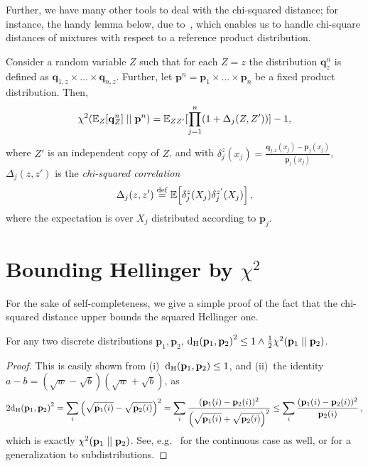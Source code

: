 \documentclass[10pt]{article}
\newcommand{\p}{\mathbf{p}}
\newcommand{\q}{\mathbf{q}}
\newcommand{\ns}{n}
\begin{document}
Further, we have many other tools to deal with the chi-squared distance; for instance, the handy lemma below, due to~\cite{Pollard03}, which enables us to handle chi-square distances of mixtures with respect to a reference product distribution.
\begin{lemma}\label{lem:mixture_chisquare}
Consider a random variable $Z$ such that for each
$Z=z$ the distribution $\q_z^\ns$ is defined as
$\q_{1,z} \times \dots \times \q_{\ns,z}$. Further, let
$\p^\ns = \p_1 \times \dots \times \p_\ns$ be a fixed product
distribution. Then,
\[
\chisquare{ \shortexpect_Z[\q_Z^\ns] }{ \p^\ns } = \shortexpect_{ZZ'}[ \prod_{j=1}^\ns (1+{\Delta_j(Z,Z')}) ] - 1,
\]
where $Z'$ is an independent copy of $Z$, and with
$\delta_j^z(x_j) = \frac{\q_{j,z}(x_j)-\p_j(x_j)}{\p_j(x_j)}$, $\Delta_j(z,z')$ is the \emph{chi-squared correlation}
\[
\Delta_j(z,z') \stackrel{\rm def}{=} \mathbb{E}\!\left[\delta_j^z(X_j)\delta_j^{z'}(X_j)\right],
\]
where the expectation is over $X_j$ distributed according to $\p_j$.
\end{lemma}

\appendix

\section{Bounding Hellinger by $\chi^2$}
For the sake of self-completeness, we give a simple proof of the fact that the chi-squared distance upper bounds the squared Hellinger one.
\begin{fact}
  \label{fact:hellinger:chisquare}
For any two discrete distributions $\p_1,\p_2$, $\hellinger{\p_1}{\p_2}^2 \leq 1\land \frac{1}{2}\chisquare{\p_1}{\p_2}$.
\end{fact}
\begin{proof}
This is easily shown from (i)~$\hellinger{\p_1}{\p_2}\leq 1$, and (ii)~the identity $a-b = (\sqrt{w}-\sqrt{b})(\sqrt{w}+\sqrt{b})$, as
\[
    2\hellinger{\p_1}{\p_2}^2 = \sum_i \Big(\sqrt{\p_1(i)}-\sqrt{\p_2(i)}\Big)^2 = \sum_i \frac{(\p_1(i)-\p_2(i))^2}{\Big(\sqrt{\p_1(i)}+\sqrt{\p_2(i)}\Big)^2} \leq \sum_i \frac{(\p_1(i)-\p_2(i))^2}{\p_2(i)}\,,
\]
which is exactly $\chisquare{\p_1}{\p_2}$.
See, e.g.~\cite{GibbsS02} for the continuous case as well, or \cite[Proposition~1]{DaskalakisKW17} for a generalization to subdistributions.
\end{proof}



\end{document}
